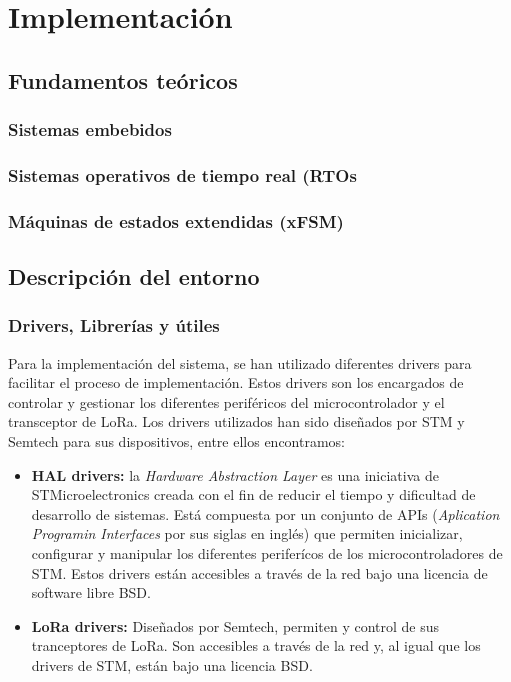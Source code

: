 	\section{Implementación}
	
	\subsection{Fundamentos teóricos}
		\subsubsection{Sistemas embebidos}
		
		\subsubsection{Sistemas operativos de tiempo real (RTOs}
		
		\subsubsection{Máquinas de estados extendidas (xFSM)}
		
		
	\subsection{Descripción del entorno}
		\subsubsection{Drivers, Librerías y útiles}
			Para la implementación del sistema, se han utilizado diferentes drivers para facilitar el proceso de implementación. Estos drivers son los encargados de controlar y gestionar los diferentes periféricos del microcontrolador y el transceptor de LoRa. Los drivers utilizados han sido diseñados por STM y Semtech para sus dispositivos, entre ellos encontramos:
			
			\begin{itemize}
				\item \textbf{HAL drivers:}  la \textit{Hardware Abstraction Layer} es una iniciativa de STMicroelectronics creada con el fin de reducir el tiempo y dificultad de desarrollo de sistemas. Está compuesta por un conjunto de APIs (\textit{Aplication Programin Interfaces} por sus siglas en inglés) que permiten inicializar, configurar y manipular los diferentes periferícos de los microcontroladores de STM. Estos drivers están accesibles a  través de la red bajo una licencia de software libre BSD.
				
				\item \textbf{LoRa drivers:} Diseñados por Semtech, permiten y control de sus tranceptores de LoRa. Son accesibles a través de la red y, al igual que los drivers de STM, están bajo una licencia BSD.
			\end{itemize}			 
			
